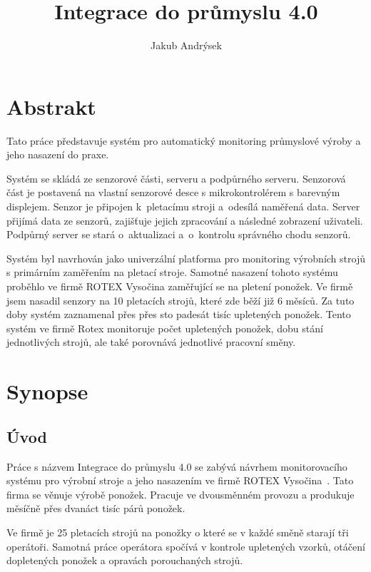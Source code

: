 \documentclass[12pt, a4paper]{article}
\title{Integrace do průmyslu 4.0}
\author{Jakub Andrýsek}
\date{}
\begin{document}

\maketitle

\section*{Abstrakt}
Tato práce představuje systém pro automatický monitoring průmyslové výroby a jeho nasazení do praxe.

Systém se skládá ze senzorové části, serveru a podpůrného serveru.
Senzorová část je postavená na vlastní senzorové desce s mikrokontrolérem s barevným displejem. Senzor je připojen k~pletacímu stroji a~odesílá naměřená data.
Server přijímá  data ze senzorů, zajišťuje jejich zpracování a následné zobrazení uživateli.
Podpůrný server se stará o~aktualizaci a~o~kontrolu správného chodu senzorů.

Systém byl navrhován jako univerzální platforma pro monitoring výrobních strojů s primárním zaměřením na pletací stroje. 
Samotné nasazení tohoto systému proběhlo ve firmě ROTEX Vysočina zaměřující se na pletení ponožek. 
Ve firmě jsem nasadil senzory na 10 pletacích strojů, které zde běží již 6 měsíců. Za tuto doby systém zaznamenal přes přes sto padesát tisíc upletených ponožek.
Tento systém ve firmě Rotex monitoruje počet upletených ponožek, dobu stání jednotlivých strojů, ale také porovnává jednotlivé pracovní směny.


\section*{Synopse}

\subsection*{Úvod}
Práce s názvem Integrace do průmyslu 4.0 se zabývá návrhem monitorovacího systému pro výrobní stroje a jeho nasazením ve firmě ROTEX Vysočina~\cite{ROTEX}. Tato firma se věnuje výrobě ponožek. Pracuje ve dvousměnném provozu a produkuje měsíčně přes dvanáct tisíc párů ponožek.

Ve firmě je 25 pletacích strojů na ponožky o které se v každé směně starají tři operátoři.
Samotná práce operátora spočívá v kontrole upletených vzorků, otáčení dopletených ponožek a opravách porouchaných strojů.
\end{document}
